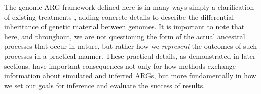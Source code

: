 \documentclass{article}
\begin{document}
The genome ARG framework defined here is
in many ways simply a clarification of existing treatments
\cite[e.g.][]{mathieson2020ancestry,shipilina2023origin},
adding concrete details to describe the
differential inheritance of genetic material between genomes.
It is important to note that here, and throughout,
we are not questioning the form of the
actual ancestral processes that occur in nature, but rather how we
\emph{represent} the outcomes of such processes in a practical manner.
These practical details,
as demonstrated in later sections, have important
consequences not only for how methods exchange information about
simulated and inferred ARGs, but more fundamentally in
how we set our goals for inference and evaluate the success of results.
\end{document}
